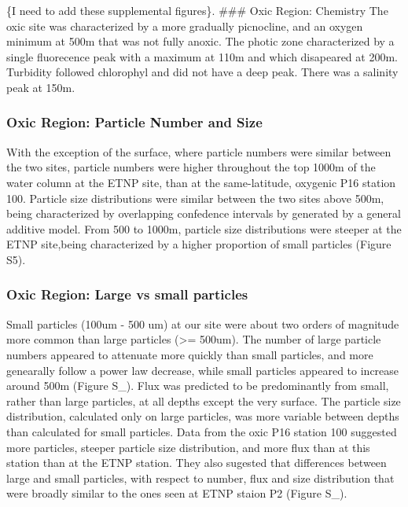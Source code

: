 \documentclass[]{article}
\begin{document}
\{I need to add these supplemental figures\}. \#\#\# Oxic Region:
Chemistry The oxic site was characterized by a more gradually
picnocline, and an oxygen minimum at 500m that was not fully anoxic. The
photic zone characterized by a single fluorecence peak with a maximum at
110m and which disapeared at 200m. Turbidity followed chlorophyl and did
not have a deep peak. There was a salinity peak at 150m.

\hypertarget{oxic-region-particle-number-and-size}{%
\subsubsection{Oxic Region: Particle Number and
Size}\label{oxic-region-particle-number-and-size}}

With the exception of the surface, where particle numbers were similar
between the two sites, particle numbers were higher throughout the top
1000m of the water column at the ETNP site, than at the same-latitude,
oxygenic P16 station 100. Particle size distributions were similar
between the two sites above 500m, being characterized by overlapping
confedence intervals by generated by a general additive model. From 500
to 1000m, particle size distributions were steeper at the ETNP
site,being characterized by a higher proportion of small particles
(Figure S5).

\hypertarget{oxic-region-large-vs-small-particles}{%
\subsubsection{Oxic Region: Large vs small
particles}\label{oxic-region-large-vs-small-particles}}

Small particles (100um - 500 um) at our site were about two orders of
magnitude more common than large particles (\textgreater{}= 500um). The
number of large particle numbers appeared to attenuate more quickly than
small particles, and more genearally follow a power law decrease, while
small particles appeared to increase around 500m (Figure S\_). Flux was
predicted to be predominantly from small, rather than large particles,
at all depths except the very surface. The particle size distribution,
calculated only on large particles, was more variable between depths
than calculated for small particles. Data from the oxic P16 station 100
suggested more particles, steeper particle size distribution, and more
flux than at this station than at the ETNP station. They also sugested
that differences between large and small particles, with respect to
number, flux and size distribution that were broadly similar to the ones
seen at ETNP staion P2 (Figure S\_).
\end{document}
